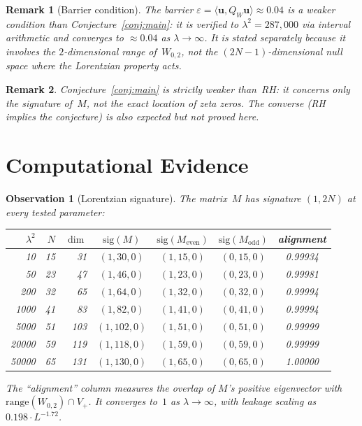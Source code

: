 \documentclass[11pt,a4paper]{article}
\newtheorem{observation}{Observation}[section]
\newtheorem{remark}{Remark}[section]
\begin{document}
\begin{remark}[Barrier condition]
The barrier $\varepsilon = \langle \mathbf{u}, Q_W \mathbf{u}\rangle \approx 0.04$ is a weaker condition than Conjecture~\ref{conj:main}: it is verified to $\lambda^2 = 287{,}000$ via interval arithmetic and converges to $\approx 0.04$ as $\lambda \to \infty$. It is stated separately because it involves the $2$-dimensional range of~$W_{0,2}$, not the $(2N-1)$-dimensional null space where the Lorentzian property acts.
\end{remark}

\begin{remark}
Conjecture~\ref{conj:main} is strictly weaker than~RH: it concerns only the signature of~$M$, not the exact location of zeta zeros. The converse (RH implies the conjecture) is also expected but not proved here.
\end{remark}

\section{Computational Evidence}\label{sec:evidence}

\begin{observation}[Lorentzian signature]\label{obs:lorentzian}
The matrix~$M$ has signature $(1, 2N)$ at every tested parameter:

\begin{center}
\begin{tabular}{rrrcccc}
\toprule
$\lambda^2$ & $N$ & $\dim$ & $\mathrm{sig}(M)$ & $\mathrm{sig}(M_{\mathrm{even}})$ & $\mathrm{sig}(M_{\mathrm{odd}})$ & alignment \\
\midrule
10 & 15 & 31 & $(1,30,0)$ & $(1,15,0)$ & $(0,15,0)$ & 0.99934 \\
50 & 23 & 47 & $(1,46,0)$ & $(1,23,0)$ & $(0,23,0)$ & 0.99981 \\
200 & 32 & 65 & $(1,64,0)$ & $(1,32,0)$ & $(0,32,0)$ & 0.99994 \\
1000 & 41 & 83 & $(1,82,0)$ & $(1,41,0)$ & $(0,41,0)$ & 0.99994 \\
5000 & 51 & 103 & $(1,102,0)$ & $(1,51,0)$ & $(0,51,0)$ & 0.99999 \\
20000 & 59 & 119 & $(1,118,0)$ & $(1,59,0)$ & $(0,59,0)$ & 0.99999 \\
50000 & 65 & 131 & $(1,130,0)$ & $(1,65,0)$ & $(0,65,0)$ & 1.00000 \\
\bottomrule
\end{tabular}
\end{center}

The ``alignment'' column measures the overlap of $M$'s positive eigenvector with $\mathrm{range}(W_{0,2}) \cap V_+$. It converges to~$1$ as $\lambda \to \infty$, with leakage scaling as $0.198 \cdot L^{-1.72}$.
\end{observation}
\end{document}
